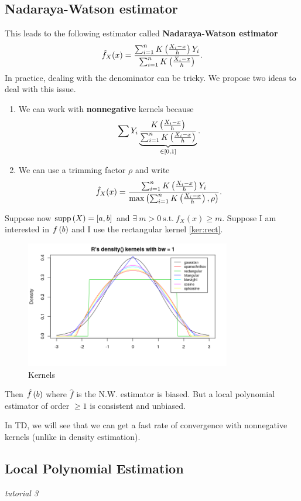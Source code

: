 \subsection{Nadaraya-Watson estimator}
This leads to the following estimator called \textbf{Nadaraya-Watson estimator}  $$\hat{f}_X(x) = \frac{\sum_{i=1}^n K\left(\frac{X_i-x}{h}\right)Y_i}{\sum_{i=1}^n K\left(\frac{X_i-x}{h}\right)}.$$
In practice, dealing with the denominator can be tricky. We propose two ideas to deal with this issue.
\begin{enumerate}
    \item We can work with \textbf{nonnegative} kernels because \begin{equation*}
        \sum Y_i \underbrace{\frac{K\left(\frac{X_i-x}{h}\right)}{\sum_{i=1}^n K\left(\frac{X_i-x}{h}\right)}}_{\in \left[0,1\right]}.
    \end{equation*}
    \item We can use a trimming factor $\rho$ and write $$\hat{f}_X(x) = \frac{\sum_{i=1}^n K\left(\frac{X_i-x}{h}\right)Y_i}{\max\left(\sum_{i=1}^n K\left(\frac{X_i-x}{h}\right),\rho\right)}.$$
\end{enumerate}
Suppose now $\text{supp}\left(X\right)=[a,b]$ and $\exists\ m>0\ \text{s.t.}\ f_X(x)\ge m$. Suppose I am interested in $f\left(b\right)$ and I use the rectangular kernel \ref{ker:rect}. 
\begin{figure}[!h]
    \centering
    \includegraphics[width=0.8\textwidth]{figures/kernels.png}
    \caption{Kernels}
\end{figure}
Then $\hat{f}\left(b\right)$ where $\hat{f}$ is the N.W. estimator is biased. But a local polynomial estimator of order $\ge 1$ is consistent and unbiased.
\begin{remark}
    In TD, we will see that we can get a fast rate of convergence with nonnegative kernels (unlike in density estimation).
\end{remark}
\subsection{Local Polynomial Estimation}
\textit{tutorial 3}